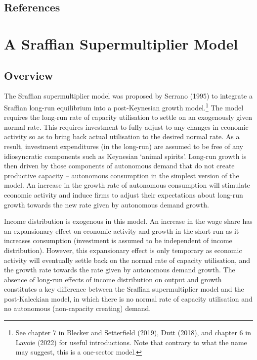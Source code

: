 \documentclass[
  letterpaper,
  DIV=11,
  numbers=noendperiod]{scrreprt}
\begin{document}
\section{References}\label{references-9}

\chapter{A Sraffian Supermultiplier
Model}\label{a-sraffian-supermultiplier-model}

\section{Overview}\label{overview-8}

The Sraffian supermultiplier model was proposed by Serrano (1995) to
integrate a Sraffian long-run equilibrium into a post-Keynesian growth
model.\footnote{See chapter 7 in Blecker and Setterfield (2019), Dutt
  (2018), and chapter 6 in Lavoie (2022) for useful introductions. Note
  that contrary to what the name may suggest, this is a one-sector
  model.} The model requires the long-run rate of capacity utilisation
to settle on an exogenously given normal rate. This requires investment
to fully adjust to any changes in economic activity so as to bring back
actual utilisation to the desired normal rate. As a result, investment
expenditures (in the long-run) are assumed to be free of any
idiosyncratic components such as Keynesian `animal spirits'. Long-run
growth is then driven by those components of autonomous demand that do
not create productive capacity -- autonomous consumption in the simplest
version of the model. An increase in the growth rate of autonomous
consumption will stimulate economic activity and induce firms to adjust
their expectations about long-run growth towards the new rate given by
autonomous demand growth.

Income distribution is exogenous in this model. An increase in the wage
share has an expansionary effect on economic activity and growth in the
short-run as it increases consumption (investment is assumed to be
independent of income distribution). However, this expansionary effect
is only temporary as economic activity will eventually settle back on
the normal rate of capacity utilisation, and the growth rate towards the
rate given by autonomous demand growth. The absence of long-run effects
of income distribution on output and growth constitutes a key difference
between the Sraffian supermultiplier model and the post-Kaleckian model,
in which there is no normal rate of capacity utilisation and no
autonomous (non-capacity creating) demand.
\end{document}
